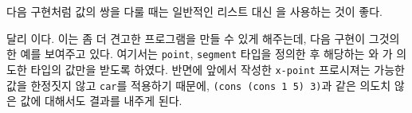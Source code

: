 






다음 구현처럼  값의 쌍을 다룰 때는 일반적인 리스트 대신
을 사용하는 것이 좋다.



 달리   이다. 이는 좀 더 견고한 프로그램을 만들 수 있게 해주는데, 다음
구현이 그것의 한 예를 보여주고 있다. 여기서는 \texttt{point}, \texttt{segment}
타입을 정의한 후 해당하는 와
가 의도한 타입의 값만을 받도록 하였다. 반면에
앞에서  작성한 \texttt{x-point} 프로시져는 가능한 값을 한정짓지
않고 \texttt{car}를 적용하기 때문에, \texttt{(cons (cons 1 5) 3)}과 같은
의도치 않은 값에 대해서도 결과를 내주게 된다.



